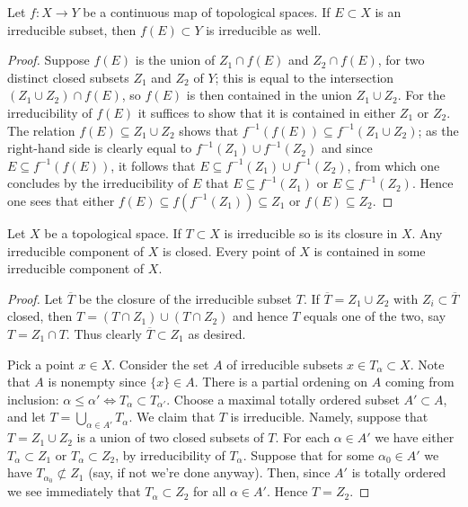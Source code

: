 \begin{lemma}
\label{lemma-image-irreducible-space}
Let $f : X \to Y$ be a continuous map of topological spaces.
If $E \subset X$ is an irreducible subset, then $f(E) \subset Y$
is irreducible as well.
\end{lemma}

\begin{proof}
Suppose $f(E)$ is the union of $Z_1 \cap f(E)$ and $Z_2 \cap f(E)$, for two
distinct closed subsets $Z_1$ and $Z_2$ of $Y$; this is equal to the
intersection $(Z_1 \cup Z_2) \cap f(E)$, so $f(E)$ is then contained in the
union $Z_1 \cup Z_2$.  For the irreducibility of $f(E)$ it suffices to show
that it is contained in either $Z_1$ or $Z_2$. The relation
$f(E) \subseteq Z_1 \cup Z_2$ shows that
$f^{-1}(f(E)) \subseteq f^{-1}(Z_1 \cup Z_2)$; as the right-hand side is
clearly equal to $f^{-1}(Z_1) \cup f^{-1}(Z_2)$ and since
$E \subseteq f^{-1}(f(E))$, it follows that
$E \subseteq f^{-1}(Z_1) \cup f^{-1}(Z_2)$, from which one concludes by the
irreducibility of $E$ that $E \subseteq f^{-1}(Z_1)$ or
$E \subseteq f^{-1}(Z_2)$.  Hence one sees that either
$f(E) \subseteq f(f^{-1}(Z_1)) \subseteq Z_1$ or $f(E) \subseteq Z_2$.
\end{proof}

\begin{lemma}
\label{lemma-irreducible}
Let $X$ be a topological space. If $T \subset X$ is irreducible
so is its closure in $X$. Any irreducible component of $X$ is
closed. Every point of $X$ is contained in some irreducible component
of $X$.
\end{lemma}

\begin{proof}
Let $\overline{T}$ be the closure of the irreducible subset $T$.
If $\overline{T} = Z_1 \cup Z_2$ with $Z_i \subset \overline{T}$
closed, then $T = (T\cap Z_1) \cup (T \cap Z_2)$ and hence
$T$ equals one of the two, say $T = Z_1 \cap T$. Thus clearly
$\overline{T} \subset Z_1$ as desired.

\medskip\noindent
Pick a point $x\in X$. Consider the set $A$ of irreducible subsets
$x \in T_\alpha \subset X$. Note that $A$ is nonempty since
$\{x\} \in A$. There is a partial ordening on $A$ coming from
inclusion: $\alpha \leq \alpha' \Leftrightarrow T_\alpha \subset T_{\alpha'}$.
Choose a maximal totally ordered subset $A' \subset A$, and let
$T = \bigcup_{\alpha \in A'} T_\alpha$. We claim that $T$ is
irreducible. Namely, suppose that $T =  Z_1 \cup Z_2$ is a union
of two closed subsets of $T$. For each $\alpha \in A'$ we have
either $T_\alpha \subset Z_1$ or $T_\alpha \subset Z_2$, by irreducibility
of $T_\alpha$. Suppose that for some $\alpha_0 \in A'$ we have
$T_{\alpha_0} \not\subset Z_1$ (say, if not we're done anyway).
Then, since $A'$ is totally ordered we see immediately that
$T_\alpha \subset Z_2$ for all $\alpha \in A'$. Hence $T = Z_2$.
\end{proof}

